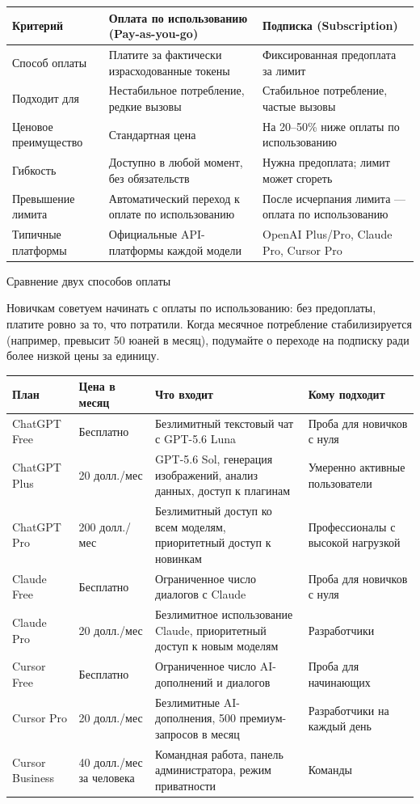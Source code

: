 
\begin{center}
\begin{tabularx}{\linewidth}{|X|X|X|}
\hline
\textbf{Критерий} & \textbf{Оплата по использованию (Pay-as-you-go)} & \textbf{Подписка (Subscription)} \tabularnewline
\hline
Способ оплаты & Платите за фактически израсходованные токены & Фиксированная предоплата за лимит \tabularnewline
Подходит для & Нестабильное потребление, редкие вызовы & Стабильное потребление, частые вызовы \tabularnewline
Ценовое преимущество & Стандартная цена & На 20–50\% ниже оплаты по использованию \tabularnewline
Гибкость & Доступно в любой момент, без обязательств & Нужна предоплата; лимит может сгореть \tabularnewline
Превышение лимита & Автоматический переход к оплате по использованию & После исчерпания лимита — оплата по использованию \tabularnewline
Типичные платформы & Официальные API-платформы каждой модели & OpenAI Plus/Pro, Claude Pro, Cursor Pro \tabularnewline
\hline
\end{tabularx}
\end{center}

\begin{center}\small\color{gray}Сравнение двух способов оплаты\end{center}

Новичкам советуем начинать с оплаты по использованию: без предоплаты, платите ровно за то, что потратили. Когда месячное потребление стабилизируется (например, превысит 50 юаней в месяц), подумайте о переходе на подписку ради более низкой цены за единицу.


\begin{center}
\begin{tabularx}{\linewidth}{|X|X|X|X|}
\hline
\textbf{План} & \textbf{Цена в месяц} & \textbf{Что входит} & \textbf{Кому подходит} \tabularnewline
\hline
ChatGPT Free & Бесплатно & Безлимитный текстовый чат с GPT-5.6 Luna & Проба для новичков с нуля \tabularnewline
ChatGPT Plus & 20 долл./мес & GPT-5.6 Sol, генерация изображений, анализ данных, доступ к плагинам & Умеренно активные пользователи \tabularnewline
ChatGPT Pro & 200 долл./мес & Безлимитный доступ ко всем моделям, приоритетный доступ к новинкам & Профессионалы с высокой нагрузкой \tabularnewline
Claude Free & Бесплатно & Ограниченное число диалогов с Claude & Проба для новичков с нуля \tabularnewline
Claude Pro & 20 долл./мес & Безлимитное использование Claude, приоритетный доступ к новым моделям & Разработчики \tabularnewline
Cursor Free & Бесплатно & Ограниченное число AI-дополнений и диалогов & Проба для начинающих \tabularnewline
Cursor Pro & 20 долл./мес & Безлимитные AI-дополнения, 500 премиум-запросов в месяц & Разработчики на каждый день \tabularnewline
Cursor Business & 40 долл./мес за человека & Командная работа, панель администратора, режим приватности & Команды \tabularnewline
\hline
\end{tabularx}
\end{center}

